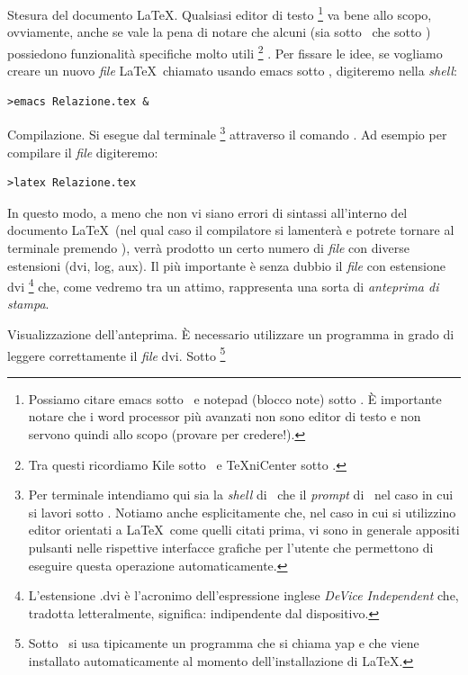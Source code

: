 \begin{numlist}
\item{
Stesura del documento \LaTeX. Qualsiasi editor di testo%
\footnote{
Possiamo citare emacs sotto \linux\ e notepad (blocco note) sotto \windows.
\`E importante notare che i word processor pi\`u avanzati non sono editor di
testo e non servono quindi allo scopo (provare per credere!).
}
va bene allo scopo, ovviamente, anche se vale la pena di notare che alcuni
(sia sotto \linux\ che sotto \windows) possiedono funzionalit\`a specifiche
molto utili%
\footnote{
Tra questi ricordiamo Kile sotto \linux\ e TeXniCenter sotto \windows.
}%
.
Per fissare le idee, se vogliamo creare un nuovo \emph{file} \LaTeX\ chiamato
 usando emacs sotto \linux, digiteremo nella \emph{shell}:
\begin{verbatim}
>emacs Relazione.tex &
\end{verbatim}
}
\item{
Compilazione. Si esegue dal terminale%
\footnote{
Per terminale intendiamo qui sia la \emph{shell} di \linux\ che il
\emph{prompt} di \dos\ nel caso in cui si lavori sotto \windows. Notiamo anche
esplicitamente che, nel caso in cui si utilizzino editor orientati a \LaTeX\
come quelli citati prima, vi sono in generale appositi pulsanti nelle
rispettive interfacce grafiche per l'utente che permettono di eseguire questa
operazione automaticamente.
}
attraverso il comando . Ad esempio per compilare il \emph{file}
\cchar{Relazione.tex} digiteremo:
\begin{verbatim}
>latex Relazione.tex
\end{verbatim}
In questo modo, a meno che non vi siano errori di sintassi all'interno del
documento \LaTeX\ (nel qual caso il compilatore si lamenter\`a e potrete
tornare al terminale premendo \ckey{CTRL + C}), verr\`a prodotto un certo
numero di \emph{file} con diverse estensioni (dvi, log, aux).
Il pi\`u importante \`e senza dubbio il \emph{file} con estensione dvi%
\footnote{
L'estensione .dvi \`e l'acronimo dell'espressione inglese \emph{DeVice
Independent} che, tradotta letteralmente, significa: indipendente dal
dispositivo.
}
che, come vedremo tra un attimo, rappresenta una sorta di \emph{anteprima di
stampa}.
}
\item{
Visualizzazione dell'anteprima. \`E necessario utilizzare un programma in
grado di leggere correttamente il \emph{file} dvi. Sotto \linux%
\footnote{
Sotto \windows\ si usa tipicamente un programma che si chiama yap e che viene
installato automaticamente al momento dell'installazione di \LaTeX.
}}
\end{numlist}
